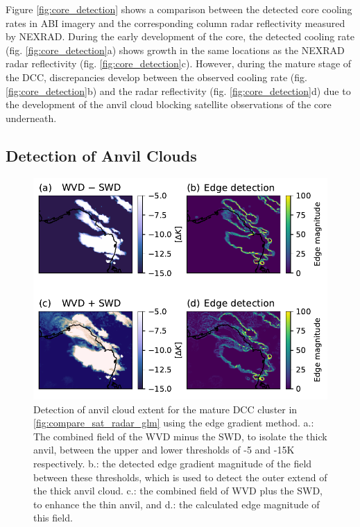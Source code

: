 \documentclass[amt, manuscript]{copernicus}
\begin{document}
Figure \ref{fig:core_detection} shows a comparison between the detected core cooling rates in ABI imagery and the corresponding column radar reflectivity measured by NEXRAD. 
During the early development of the core, the detected cooling rate (fig. \ref{fig:core_detection}a) shows growth in the same locations as the NEXRAD radar reflectivity (fig. \ref{fig:core_detection}c).
However, during the mature stage of the DCC, discrepancies develop between the observed cooling rate (fig.\ref{fig:core_detection}b) and the radar reflectivity (fig. \ref{fig:core_detection}d) due to the development of the anvil cloud blocking satellite observations of the core underneath.

\subsection{Detection of Anvil Clouds}

\begin{figure}[t]
    \includegraphics[width=12cm]{figure07.pdf}
    \caption{Detection of anvil cloud extent for the mature DCC cluster in \ref{fig:compare_sat_radar_glm} using the edge gradient method. a.: The combined field of the WVD minus the SWD, to isolate the thick anvil, between the upper and lower thresholds of -5 and -15\unit{K} respectively. b.: the detected edge gradient magnitude of the field between these thresholds, which is used to detect the outer extend of the thick anvil cloud. c.: the combined field of WVD plus the SWD, to enhance the thin anvil, and d.: the calculated edge magnitude of this field.}
    \label{fig:edge_detection}
\end{figure}
\end{document}
